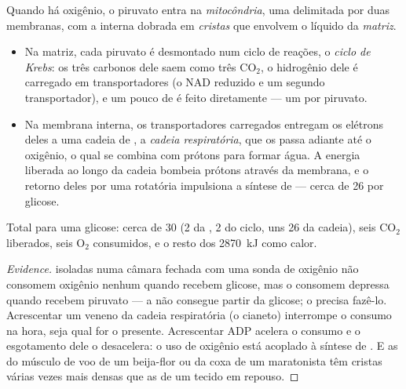 \begin{proposition}\label{prop:g12:respiration-fermentation:mitochondrion}
Quando há oxigênio, o piruvato entra na
\emph{mitocôndria}, uma  delimitada por duas
membranas, com a interna dobrada em \emph{cristas} que envolvem o
líquido da \emph{matriz}.
\begin{itemize}
  \item Na matriz, cada piruvato é desmontado num ciclo de reações, o
        \emph{ciclo de Krebs}: os três carbonos
        dele saem como três $\mathrm{CO_2}$, o hidrogênio dele é
        carregado em transportadores (o NAD reduzido e um segundo
        transportador), e um pouco de  é feito diretamente --- um
        por piruvato.
  \item Na membrana interna, os transportadores carregados entregam os
        elétrons deles a uma cadeia de , a \emph{cadeia
        respiratória}, que os passa adiante até o oxigênio, o qual se
        combina com prótons para formar água. A energia liberada ao
        longo da cadeia bombeia prótons através da membrana, e o
        retorno deles por uma  rotatória impulsiona a síntese de
         --- cerca de 26 por glicose.
\end{itemize}
Total para uma glicose: cerca de 30  (2 da , 2 do ciclo,
uns 26 da cadeia), seis $\mathrm{CO_2}$ liberados, seis
$\mathrm{O_2}$ consumidos, e o resto dos \qty{2870}{kJ} como calor.
\end{proposition}
\begin{proof}[Evidence]
 isoladas numa câmara fechada com uma sonda de oxigênio não
consomem oxigênio nenhum quando recebem glicose, mas o consomem
depressa quando recebem piruvato --- a  não consegue partir
da glicose; o  precisa fazê-lo. Acrescentar um veneno da
cadeia respiratória (o cianeto) interrompe o consumo na hora, seja qual
for o  presente. Acrescentar ADP acelera o consumo e o
esgotamento dele o desacelera: o uso de oxigênio está acoplado à
síntese de . E as  do músculo de voo de um beija-flor ou
da coxa de um maratonista têm cristas várias vezes mais densas que as
de um tecido em repouso.
\end{proof}

